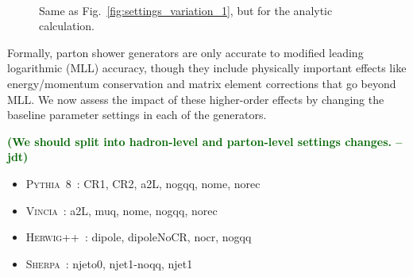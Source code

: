 \documentclass[11pt,letterpaper]{article}
\newcommand{\pythia}{\textsc{Pythia~8}\xspace}
\newcommand{\herwig}{\textsc{Herwig++}\xspace}
\newcommand{\vincia}{\textsc{Vincia}\xspace}
\newcommand{\sherpa}{\textsc{Sherpa}\xspace}
\DeclareRobustCommand{\Fig}[1]{Fig.~\ref{#1}}
\newcommand{\jdt}[1]{\textbf{\textcolor{darkgreen}{(#1 --jdt)}}}
\begin{document}
\begin{figure}
\centering
{}
$\quad$
\caption{Same as \Fig{fig:settings_variation_1}, but for the analytic calculation.}
\end{figure}



Formally, parton shower generators are only accurate to modified leading logarithmic (MLL) accuracy, though they include physically important effects like energy/momentum conservation and matrix element corrections that go beyond MLL.  We now assess the impact of these higher-order effects by changing the baseline parameter settings in each of the generators.

\jdt{We should split into hadron-level and parton-level settings changes.}


\begin{itemize}
\item \pythia\ : CR1, CR2, a2L, nogqq, nome, norec
\item \vincia\ : a2L, muq, nome, nogqq, norec
\item \herwig\ : dipole, dipoleNoCR, nocr, nogqq
\item \sherpa\ : njeto0, njet1-noqq, njet1
\end{itemize}
\end{document}
